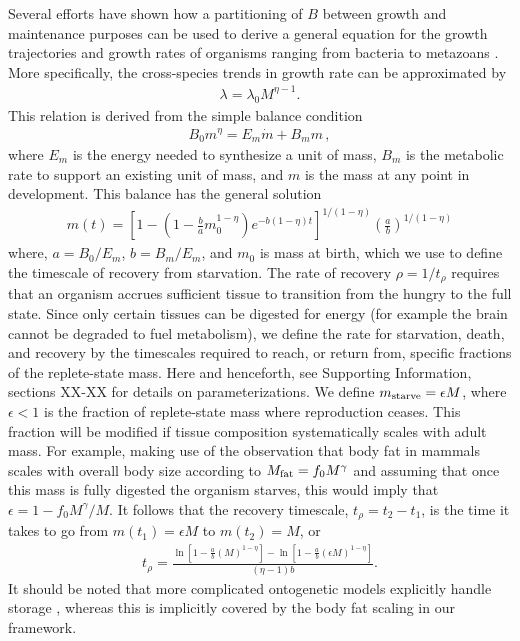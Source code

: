 \documentclass{pnastwo}
\begin{document}
\begin{article}
Several efforts have shown how a
partitioning of $B$ between growth and maintenance purposes
can be used to derive a general equation for the growth trajectories and
growth rates of organisms ranging from bacteria to metazoans
\cite{West:2001bv,moses2008rmo,gillooly2002esa,hou,Kempes:2012hy}. More specifically, the cross-species trends in growth rate can be
approximated by
\begin{eqnarray}
\lambda = \lambda_0 M^{\eta-1}.
\label{lambda}
\end{eqnarray}
This relation is derived from the simple balance condition \cite{West:2001bv,moses2008rmo,gillooly2002esa,hou,Kempes:2012hy}
\begin{eqnarray}
\label{balance}
B_{0}m^{\eta}=E_{m}\dot{m}+B_{m}m\,,
\end{eqnarray}
where $E_{m}$ is the energy needed to synthesize a unit of mass, $B_{m}$ is
the metabolic rate to support an existing unit of mass, and $m$ is the mass
at any point in development.  This balance has the general solution \cite{moses2008rmo, Kempes:2012hy}
\begin{eqnarray}
m\left(t\right)\!=\left[1\!-\!\left(1\!-\!\frac{b}{a}m_{0}^{1\!-\!\eta}\right)e^{-b\left(1\!-\!\eta\right)t}\right]^{1/\left(1-\eta\right)}\!\left(\!\frac{a}{b}\!\right)^{1/(1-\eta)}
\end{eqnarray}
where, $a=B_{0}/E_{m}$, $b=B_{m}/E_{m}$, and $m_0$ is mass at birth, which we use to define the timescale of recovery from starvation. The rate of recovery $\rho = 1/t_\rho$ requires that an organism accrues
sufficient tissue to transition from the hungry to the full state.  Since only certain tissues can be digested for energy (for example the brain
cannot be degraded to fuel metabolism), we define the rate for starvation,
death, and recovery by the timescales required to reach, or return from, specific fractions of the
replete-state mass. 
Here and henceforth, see Supporting Information, sections XX-XX for details on parameterizations.
We define $m_{\rm starve}=\epsilon M$, where
$\epsilon<1$ is the fraction of replete-state mass where reproduction ceases. This fraction will be modified if tissue composition systematically scales
with adult mass.  For example, making use of the observation that body fat in
mammals scales with overall body size according to $M_{\rm fat}=f_{0}M^{\gamma}$
and assuming that once this mass is fully digested the organism starves, this
would imply that $\epsilon=1-f_{0}M^{\gamma}/M$. It follows that the recovery timescale, $t_{\rho}=t_{2}-t_{1}$, is the time it takes
to go from $m\left(t_{1}\right)=\epsilon M$ to $m\left(t_{2}\right)=M$, or
\begin{eqnarray}
t_{\rho}=\frac{\ln\left[1\!-\!\frac{a}{b}\left(M
  \right)^{1\!-\!\eta }\right]
-\ln \left[1\!-\!\frac{a}{b}\left(\epsilon M \right)^{1\!-\!\eta }\right]}{(\eta -1) b}.
\end{eqnarray}
It should be noted that more complicated ontogenetic models explicitly handle storage \cite{hou}, whereas this is implicitly covered by the body fat scaling in our framework.


\end{article}
\end{document}
